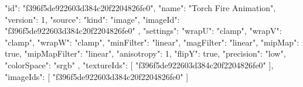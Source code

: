 {
  "id": "f396f5de922603d384c20f2204826fe0",
  "name": "Torch Fire Animation",
  "version": 1,
  "source": {
    "kind": "image",
    "imageId": "f396f5de922603d384c20f2204826fe0"
  },
  "settings": {
    "wrapU": "clamp",
    "wrapV": "clamp",
    "wrapW": "clamp",
    "minFilter": "linear",
    "magFilter": "linear",
    "mipMap": true,
    "mipMapFilter": "linear",
    "anisotropy": 1,
    "flipY": true,
    "precision": "low",
    "colorSpace": "srgb"
  },
  "textureIds": [
    "f396f5de922603d384c20f2204826fe0"
  ],
  "imageIds": [
    "f396f5de922603d384c20f2204826fe0"
  ]
}
